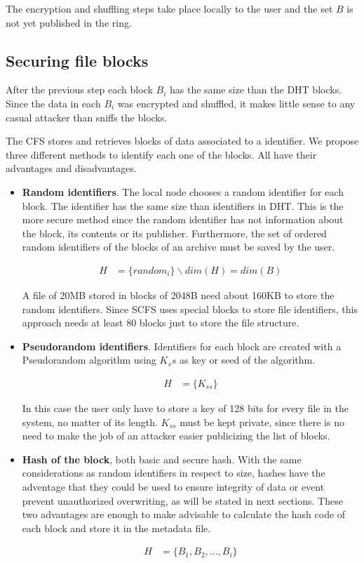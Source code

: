 \documentclass{llncs}
\begin{document}
The encryption and shuffling steps take place locally to the user and the set $B$ is not yet published in the ring.

\subsection{Securing file blocks}
\label{sec:blocks}

After the previous step each block $B_i$ has the same size than the DHT blocks. Since the data in each $B_i$ was encrypted and shuffled, it makes little sense to any casual attacker than sniffs the blocks.

The CFS stores and retrieves blocks of data associated to a identifier. We propose three
different methods to identify each one of the blocks. All have their advantages and disadvantages.

\begin{itemize}
 \item \textbf{Random identifiers}. The local node chooses a random identifier for each block. The identifier has
 the same size than identifiers in DHT. This
 is the more secure method since the random identifier has not information about the block,
 its contents or its publisher. Furthermore, the set of ordered random identifiers of the blocks
 of an archive must be saved by the user.
 
 \begin{align}
 H & = \lbrace random_i \rbrace \backslash dim(H)=dim(B)
 \end{align}
 
 A file of 20MB stored in blocks of 2048B need about 160KB
 to store the random identifiers. Since SCFS uses special blocks to store file identifiers, this approach
 needs at least 80 blocks just to store the file structure.
 
 \item \textbf{Pseudorandom identifiers}. Identifiers for each block are created with a Pseudorandom algorithm
 using $K_ss$ as key or seed of the algorithm.
 
 \begin{align}
 H & = \lbrace K_{ss} \rbrace
 \end{align} 
 
 In this case the user only have to store a key of 128 bits for every file in the system, no matter of its length. $K_{ss}$ must be kept private, since there is no need
 to make the job of an attacker easier publicizing the list of blocks.
 
 \item \textbf{Hash of the block}, both basic and secure hash. With the same considerations as random identifiers
 in respect to size, hashes have the adventage that they could be used to ensure integrity of data
 or event prevent unauthorized overwriting, as will be stated in next sections. These two advantages are
 enough to make advisable to calculate the hash code of each block and store it in the metadata file.
 
 \begin{align}
 H & = \lbrace B_1, B_2, ... , B_i \rbrace
 \end{align}
 
\end{itemize}
\end{document}
